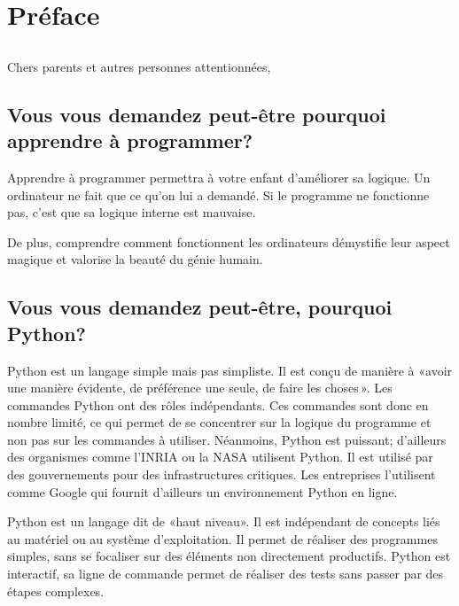 



\markboth{}{}

\chapter{Préface}
\section*{}

Chers parents et autres personnes attentionnées,\\

\section*{Vous vous demandez peut-être pourquoi apprendre à programmer?}
Apprendre à programmer permettra à votre enfant d'améliorer sa logique. Un ordinateur ne fait que ce qu'on lui a demandé. Si le programme ne fonctionne pas, c'est que sa logique interne est mauvaise. 

De plus, comprendre comment fonctionnent les ordinateurs démystifie leur aspect magique et valorise la beauté du génie humain.


\section*{Vous vous demandez peut-être, pourquoi Python?}
Python est un langage simple mais pas simpliste. Il est conçu de manière à «avoir une manière évidente, de préférence une seule, de faire les choses ». Les commandes Python ont des rôles indépendants. Ces commandes sont donc en nombre limité, ce qui permet de se concentrer sur la logique du programme et non pas sur les commandes à utiliser. 
Néanmoins, Python est puissant; d'ailleurs des organismes comme l'INRIA ou la NASA utilisent Python. Il est utilisé par des gouvernements pour des infrastructures critiques. Les entreprises l'utilisent comme Google qui fournit d'ailleurs un environnement Python en ligne.

Python est un langage dit de «haut niveau». Il est indépendant de concepts liés au matériel ou au système d'exploitation. Il permet de réaliser des programmes simples, sans se focaliser sur des éléments non directement productifs. Python est interactif, sa ligne de commande permet de réaliser des tests sans passer par des étapes complexes.

